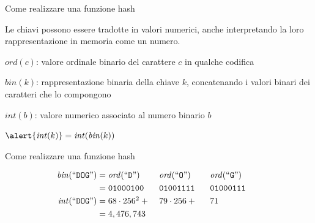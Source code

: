 \begin{frame}{Come realizzare una funzione hash}

\vspace{-9pt}
\begin{myboxtitle}[Assunzione]
Le chiavi possono essere tradotte in valori numerici, anche
interpretando la loro rappresentazione in memoria come un numero.
\end{myboxtitle}

\begin{myboxtitle}
\BI
\item \alert{$\mathit{ord}(c)$}: valore ordinale binario del carattere $c$ in qualche codifica
\item \alert{$\mathit{bin}(k)$}:	rappresentazione binaria della chiave $k$, concatenando i valori binari 
  dei caratteri che lo compongono
\item \alert{$\mathit{int}(b)$}: valore numerico associato al numero binario $b$
\item $\alert{\mathit{int}(k)} = \mathit{int}(\mathit{bin}(k))$
\EI
\end{myboxtitle}


\end{frame}

\begin{frame}{Come realizzare una funzione hash}

\vspace{-9pt}

\begin{align*}
\mathit{bin}(``\texttt{DOG}") &= \makebox[2.1cm][l]{$\mathit{ord}(``\mathtt{D}")$} \makebox[2.1cm][l]{$\mathit{ord}(``\mathtt{O}")$} \makebox[2.1cm][l]{$\mathit{ord}(``\mathtt{G}"$)} \\
	&= \makebox[2.1cm][l]{\texttt{01000100}} \makebox[2.1cm][l]{\texttt{01001111}} \makebox[2.1cm][l]{\texttt{01000111}} \\
\mathit{int}(``\texttt{DOG}") &= \makebox[2.1cm][l]{$68 \cdot 256^2 + {}$} \makebox[2.1cm][l]{$79 \cdot 256 + {}$} \makebox[2.1cm][l]{$71$} \\
	&= 4,476,743
\end{align*}

\bigskip
{}


\end{frame}

